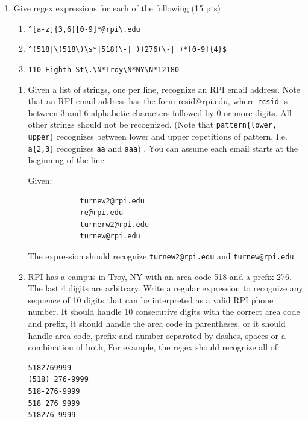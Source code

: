 \documentclass[10pt]{article}
\begin{document}
\begin{enumerate}
	\item Give regex expressions for each of the following (15 pts)
	
	\beginanswers
		\begin{enumerate}[1]
		\bigskip
		\item \verb|^[a-z]{3,6}[0-9]*@rpi\.edu|
		\bigskip
		\item \verb!^(518|\(518\)\s*|518(\-| ))276(\-| )*[0-9]{4}$!
		\bigskip
		\item \verb|110 Eighth St\.\N*Troy\N*NY\N*12180|
		\end{enumerate}
	\else
		
		\begin{enumerate}[a]
		\bigskip
		\item Given a list of strings, one per line, recognize an RPI email address. Note that an RPI email address has the form rcsid@rpi.edu, where \verb|rcsid| is between 3 and 6 alphabetic characters followed by 0 or more digits. All other strings should not be recognized. (Note that \verb|pattern{lower, upper}| recognizes between lower and upper repetitions of  pattern. I.e. \verb|a{2,3}| recognizes \verb|aa| and \verb|aaa|) . You can assume each email starts at the beginning of the line.
		
		Given:
		
		\begin{verbatim}
			turnew2@rpi.edu
			re@rpi.edu
			turnerw2@rpi.edu
			turnew@rpi.edu
		\end{verbatim}
		
		The expression should recognize \verb*|turnew2@rpi.edu| and \verb*|turnew@rpi.edu|
		\bigskip
		\bigskip
	\bigskip
	\bigskip
		\bigskip
	\bigskip
	\bigskip
		\bigskip
		\bigskip
	\bigskip
\bigskip
\bigskip
		\item RPI has a campus in Troy, NY with an area code 518 and a prefix 276. The last 4 digits are arbitrary. Write a regular expression to recognize any sequence of 10 digits that can be interpreted as a valid RPI phone number. It should handle 10 consecutive digits with the correct area code and prefix, it should handle the area code in parentheses, or it should handle area code, prefix and number separated by dashes, spaces or a combination of both, For example, the regex should recognize all of:
		
\begin{verbatim}
5182769999
(518) 276-9999
518-276-9999
518 276 9999
518276 9999
\end{verbatim}


\end{enumerate}
\end{enumerate}
\end{document}
